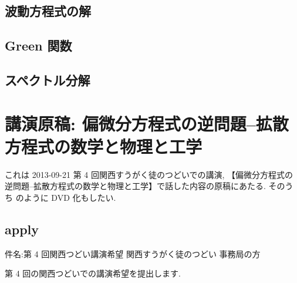 \documentclass[openany, a4paper, oneside]{book}
\theoremstyle{break}
\theoremstyle{breakdefn}
\begin{document}
\section{波動方程式の解}
\label{sec-7-8-4}
\section{Green 関数}
\label{sec-7-8-5}
\section{スペクトル分解}
\label{sec-7-8-6}
\chapter{講演原稿: 偏微分方程式の逆問題--拡散方程式の数学と物理と工学}
\label{sec-7-9}

これは 2013-09-21 第 4 回関西すうがく徒のつどいでの講演,
【偏微分方程式の逆問題--拡散方程式の数学と物理と工学】で話した内容の原稿にあたる.
そのうち \cite{phasetr1} のように DVD 化もしたい.
\section{apply}
\label{sec-7-9-1}

件名:第 4 回関西つどい講演希望
関西すうがく徒のつどい 事務局の方

第 4 回の関西つどいでの講演希望を提出します.
\end{document}
